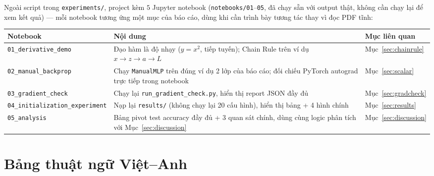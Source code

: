 \documentclass[12pt,a4paper]{article}
\begin{document}
Ngoài script trong \texttt{experiments/}, project kèm $5$ Jupyter notebook
(\texttt{notebooks/01}--\texttt{05}, đã chạy sẵn với output thật, không
cần chạy lại để xem kết quả) --- mỗi notebook tương ứng một mục của báo
cáo, dùng khi cần trình bày tương tác thay vì đọc PDF tĩnh:

\begin{table}[htbp]
\centering
\small
\begin{tabular}{@{}p{2.5cm}p{8.8cm}p{2.4cm}@{}}
\toprule
\textbf{Notebook} & \textbf{Nội dung} & \textbf{Mục liên quan} \\
\midrule
\texttt{01\_\allowbreak derivative\_\allowbreak demo} & Đạo hàm là độ nhạy ($y=x^2$, tiếp tuyến); Chain Rule trên ví dụ $x\to z\to a\to L$ & Mục~\ref{sec:chainrule} \\
\texttt{02\_\allowbreak manual\_\allowbreak backprop} & Chạy \texttt{ManualMLP} trên đúng ví dụ 2 lớp của báo cáo; đối chiếu PyTorch autograd trực tiếp trong notebook & Mục~\ref{sec:scalar} \\
\texttt{03\_\allowbreak gradient\_\allowbreak check} & Chạy lại \texttt{run\_gradient\_check.py}, hiển thị report JSON đầy đủ & Mục~\ref{sec:gradcheck} \\
\texttt{04\_\allowbreak initialization\_\allowbreak experiment} & Nạp lại \texttt{results/} (không chạy lại 20 cấu hình), hiển thị bảng + 4 hình chính & Mục~\ref{sec:results} \\
\texttt{05\_\allowbreak analysis} & Bảng pivot test accuracy đầy đủ + 3 quan sát chính, dùng cùng logic phân tích với Mục~\ref{sec:discussion} & Mục~\ref{sec:discussion} \\
\bottomrule
\end{tabular}
\label{tab:notebooks}
\end{table}

\section{Bảng thuật ngữ Việt--Anh}
\label{app:glossary}
\end{document}
